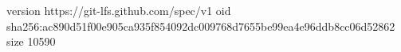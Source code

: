 version https://git-lfs.github.com/spec/v1
oid sha256:ac890d51f00e905ca935f854092dc009768d7655be99ea4e96ddb8cc06d52862
size 10590
